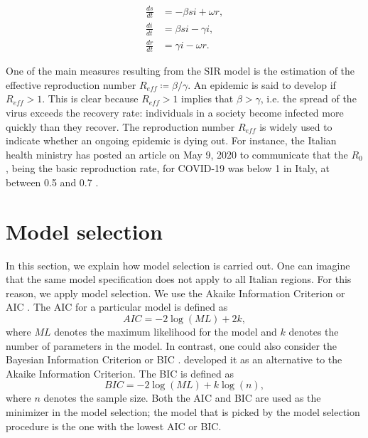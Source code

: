 \documentclass[12pt]{article}
\begin{document}
	\begin{align}
    	\frac{ds}{dt} &= -\beta si + \omega r, \label{eq:SIR_model_X}\\
    	\frac{di}{dt} &= \beta si - \gamma i, \label{eq:SIR_model_Y}\\
    	\frac{dr}{dt} &= \gamma i - \omega r. \label{eq:SIR_model_Z}
	\end{align}
	
	One of the main measures resulting from the SIR model is the estimation of the effective reproduction number $R_{eff} \coloneqq \beta / \gamma$. An epidemic is said to develop if $R_{eff} > 1$. This is clear because $R_{eff} > 1$ implies that $\beta > \gamma$, i.e. the spread of the virus exceeds the recovery rate: individuals in a society become infected more quickly than they recover. The reproduction number $R_{eff}$ is widely used to indicate whether an ongoing epidemic is dying out. For instance, the Italian health ministry has posted an article on May 9, 2020 to communicate that the $R_0$, being the basic reproduction rate, for COVID-19 was below 1 in Italy, at between 0.5 and 0.7 \parencite{saluteR0}.
	
	\section{Model selection} \label{sec:model_selection}
	In this section, we explain how model selection is carried out. One can imagine that the same model specification does not apply to all Italian regions. For this reason, we apply model selection. We use the Akaike Information Criterion or AIC \parencite{akaike1974new}. The AIC for a particular model is defined as
	\begin{equation} \label{eq:AIC}
    	AIC = -2\log(ML) + 2k,    
	\end{equation}
	where $ML$ denotes the maximum likelihood for the model and $k$ denotes the number of parameters in the model. In contrast, one could also consider the Bayesian Information Criterion or BIC \parencite{schwarz1978estimating}. \textcite{schwarz1978estimating} developed it as an alternative to the Akaike Information Criterion. The BIC is defined as
	\begin{equation} \label{eq:BIC}
    	BIC = -2\log(ML) + k\log(n),
	\end{equation}
	where $n$ denotes the sample size. Both the AIC and BIC are used as the minimizer in the model selection; the model that is picked by the model selection procedure is the one with the lowest AIC or BIC. \\
	
\end{document}
